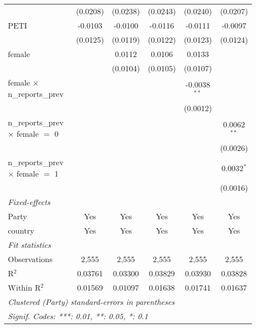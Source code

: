 \begin{tabular}{lccccc}
                                             & (0.0208)       & (0.0238)       & (0.0243)       & (0.0240)       & (0.0207)\\   
   PETI                                      & -0.0103        & -0.0100        & -0.0116        & -0.0111        & -0.0097\\   
                                             & (0.0125)       & (0.0119)       & (0.0122)       & (0.0123)       & (0.0124)\\   
   female                                    &                & 0.0112         & 0.0106         & 0.0133         &   \\   
                                             &                & (0.0104)       & (0.0105)       & (0.0107)       &   \\   
   female $\times$ n\_reports\_prev          &                &                &                & -0.0038$^{**}$ &   \\   
                                             &                &                &                & (0.0012)       &   \\   
   n\_reports\_prev $\times$ female $=$ 0    &                &                &                &                & 0.0062$^{**}$\\   
                                             &                &                &                &                & (0.0026)\\   
   n\_reports\_prev $\times$ female $=$ 1    &                &                &                &                & 0.0032$^{*}$\\   
                                             &                &                &                &                & (0.0016)\\   
   \midrule
   \emph{Fixed-effects}\\
   Party                                     & Yes            & Yes            & Yes            & Yes            & Yes\\  
   country                                   & Yes            & Yes            & Yes            & Yes            & Yes\\  
   \midrule
   \emph{Fit statistics}\\
   Observations                              & 2,555          & 2,555          & 2,555          & 2,555          & 2,555\\  
   R$^2$                                     & 0.03761        & 0.03300        & 0.03829        & 0.03930        & 0.03828\\  
   Within R$^2$                              & 0.01569        & 0.01097        & 0.01638        & 0.01741        & 0.01637\\  
   \midrule \midrule
   \multicolumn{6}{l}{\emph{Clustered (Party) standard-errors in parentheses}}\\
   \multicolumn{6}{l}{\emph{Signif. Codes: ***: 0.01, **: 0.05, *: 0.1}}\\
\end{tabular}
\par\endgroup


